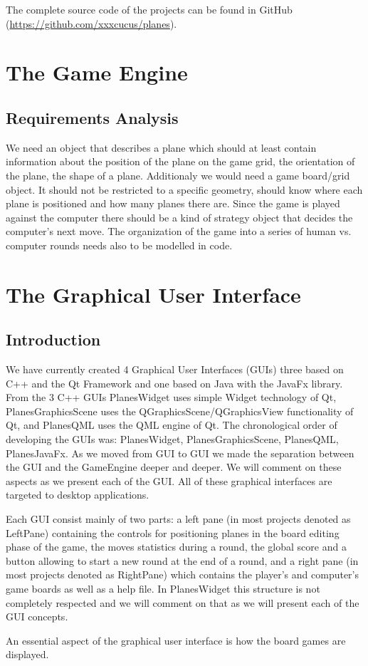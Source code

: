 \documentclass{report}
\begin{document}
The complete source code of the projects can be found in GitHub (\url{https://github.com/xxxcucus/planes}).

\chapter {The Game Engine }
\section{Requirements Analysis}
We need an object that describes a plane which should at least contain information about the position of the plane on the game grid, the orientation of the plane, the shape of a plane. Additionaly we would need a game board/grid object. It should not be restricted to a specific geometry, should know where each plane is positioned and how many planes there are. Since the game is played against the computer there should be a kind of strategy object that decides the computer's next move. The organization of the game into a series of human vs. computer rounds needs also to be modelled in code.







\chapter {The Graphical User Interface}

\section{Introduction}

We have currently created 4 Graphical User Interfaces (GUIs) three based on C++ and the Qt Framework and one based on Java with the JavaFx library. From the 3 C++ GUIs PlanesWidget uses simple Widget technology of Qt, PlanesGraphicsScene uses the QGraphicsScene/QGraphicsView functionality of Qt, and PlanesQML uses the QML engine of Qt. The chronological order of developing the GUIs was: PlanesWidget, PlanesGraphicsScene, PlanesQML, PlanesJavaFx. As we moved from GUI to GUI we made the separation between the GUI and the GameEngine deeper and deeper. We will comment on these aspects as we present each of the GUI. All of these graphical interfaces are targeted to desktop applications.

Each GUI consist mainly of two parts: a left pane (in most projects denoted as LeftPane) containing the controls for positioning planes in the board editing phase of the game, the moves statistics during a round, the global score and a button allowing to start a new round at the end of a round, and a right pane (in most projects denoted as RightPane) which contains the player's and computer's game boards as well as a help file. In PlanesWidget this structure is not completely respected and we will comment on that as we will present each of the GUI concepts.

An essential aspect of the graphical user interface is how the board games are displayed. 






\begin{appendices}
	
\end{appendices}
\end{document}
